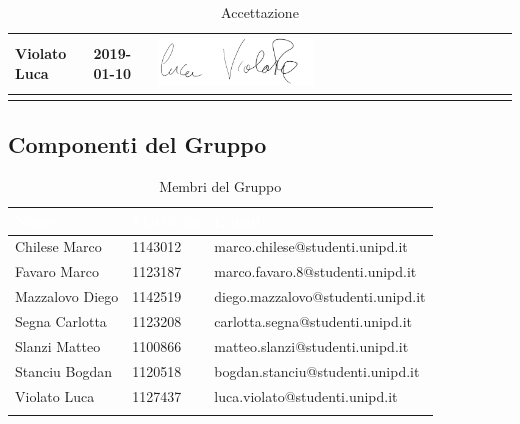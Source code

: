 \begin{longtable}{|C{.25\textwidth}|C{.16\textwidth}|C{.45\textwidth}|}
\hline
Violato Luca & 2019-01-10 & \includegraphics[width=0.45\textwidth]{./images/PNG/LucaViolato.png}\\
\hline
\caption{Accettazione}
\label{Tabella Accettazione}
\end{longtable}

\subsection{Componenti del Gruppo}

\begin{longtable}{|C{.25\textwidth}|C{.16\textwidth}|C{.45\textwidth}|}
\hline
{}\textbf{\textcolor{white}{Nome}} & \textbf{\textcolor{white}{Matricola}} & \textbf{\textcolor{white}{E-mail}}\\
\hline \hline
\endfirsthead
Chilese Marco & 1143012 & marco.chilese@studenti.unipd.it \\
\hline
{}Favaro Marco & 1123187 & marco.favaro.8@studenti.unipd.it \\
\hline
Mazzalovo Diego & 1142519 & diego.mazzalovo@studenti.unipd.it \\
\hline
{}Segna Carlotta & 1123208 & carlotta.segna@studenti.unipd.it \\
\hline
Slanzi Matteo & 1100866 & matteo.slanzi@studenti.unipd.it \\
\hline
{}Stanciu Bogdan & 1120518 & bogdan.stanciu@studenti.unipd.it \\
\hline
Violato Luca & 1127437 & luca.violato@studenti.unipd.it \\
\hline
\caption{Membri del Gruppo}
\label{Tabella Membri del Gruppo}
\end{longtable}
